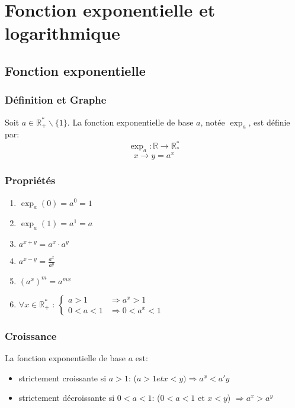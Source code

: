 \documentclass[12pt,a4paper]{report}
\begin{document}
	\chapter[Analyse]{Fonction exponentielle et logarithmique}
	\section*{Fonction exponentielle}
	\subsection*{Définition et Graphe}
	Soit $a \in \mathbb{R}^{*}_{+} \backslash \{1\}$. La fonction exponentielle de base $a$, notée $\exp_{a}$, est définie par: \[ \exp_{a}: \mathbb{R} \rightarrow \mathbb{R}^{*}_{*}\] \[x \rightarrow y=a^{x} \]
	
	\subsection*{Propriétés}
	\begin{enumerate}
		\item $\exp_{a}(0)=a^0=1$
		\item $\exp_{a}(1)=a^1=a$
		\item $a^{x+y}=a^x\cdot a^y$
		\item $a^{x-y}=\frac{a^x}{a^y}$
		\item $(a^x)^m=a^{mx}$
		\item $\forall x \in \mathbb{R}^{*}_{+}$ :
		$\begin{cases}
			a>1 &\Rightarrow a^x>1 \\
			0<a<1 &\Rightarrow 0<a^x<1
		\end{cases}$
	\end{enumerate}
	\subsection*{Croissance}
	La fonction exponentielle de base $a$ est:
	\begin{itemize}
		\item strictement croissante si $a>1$: ($a>1 et x<y) \Rightarrow a^x<a'y$
		\item strictement décroissante si $0<a<1$: ($0<a<1$ et $x<y$) $\Rightarrow a^x>a^y$
	\end{itemize}
\end{document}
